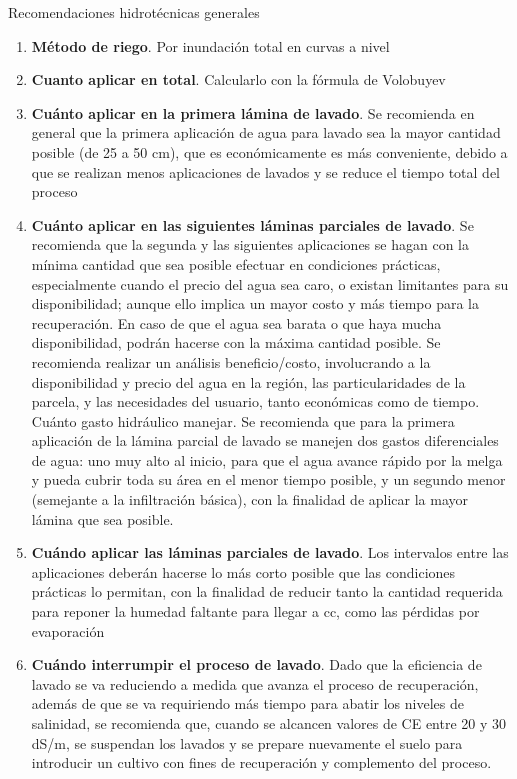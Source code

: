 Recomendaciones hidrotécnicas generales
\begin{enumerate}
    \item \textbf{Método de riego}. Por inundación total en curvas a nivel
    \item \textbf{Cuanto aplicar en total}. Calcularlo con la fórmula de Volobuyev
    \item \textbf{Cuánto aplicar en la primera lámina de lavado}. Se recomienda en general que la primera aplicación de agua para lavado sea la mayor cantidad posible (de 25 a 50 cm), que es económicamente es más conveniente, debido a que se realizan menos aplicaciones de lavados y se reduce el tiempo total del proceso
    \item \textbf{Cuánto aplicar en las siguientes láminas parciales de lavado}. Se recomienda que la segunda y las siguientes aplicaciones se hagan con la mínima cantidad que sea posible efectuar en condiciones prácticas, especialmente cuando el precio del agua sea caro, o existan limitantes para su disponibilidad; aunque ello implica un mayor costo y más tiempo para la recuperación. En caso de que el agua sea barata o que haya mucha disponibilidad, podrán hacerse con la máxima cantidad posible. Se recomienda realizar un análisis beneficio/costo, involucrando a la disponibilidad y precio del agua en la región, las particularidades de la parcela, y las necesidades del usuario, tanto económicas como de tiempo. Cuánto gasto hidráulico manejar. Se recomienda que para la primera aplicación de la lámina parcial de lavado se manejen dos gastos diferenciales de agua: uno muy alto al inicio, para que el agua avance rápido por la melga y pueda cubrir toda su área en el menor tiempo posible, y un segundo menor (semejante a la infiltración básica), con la finalidad de aplicar la mayor lámina que sea posible.
    \item \textbf{Cuándo aplicar las láminas parciales de lavado}. Los intervalos entre las aplicaciones deberán hacerse lo más corto posible que las condiciones prácticas lo permitan, con la finalidad de reducir tanto la cantidad requerida para reponer la humedad faltante para llegar a cc, como las pérdidas por evaporación
    \item \textbf{Cuándo interrumpir el proceso de lavado}. Dado que la eficiencia de lavado se va reduciendo a medida que avanza el proceso de recuperación, además de que se va requiriendo más tiempo para abatir los niveles de salinidad, se recomienda que, cuando se alcancen valores de CE entre 20 y 30 dS/m, se suspendan los lavados y se prepare nuevamente el suelo para introducir un cultivo con fines de recuperación y complemento del proceso.
\end{enumerate}
